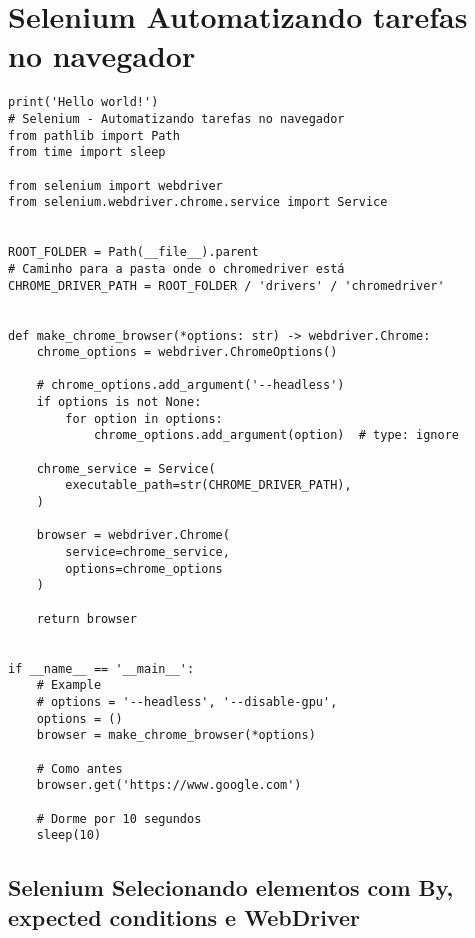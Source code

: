 \documentclass{article}
\begin{document}
\section{Selenium  Automatizando tarefas no navegador}
\begin{lstlisting}
print('Hello world!')
# Selenium - Automatizando tarefas no navegador
from pathlib import Path
from time import sleep

from selenium import webdriver
from selenium.webdriver.chrome.service import Service


ROOT_FOLDER = Path(__file__).parent
# Caminho para a pasta onde o chromedriver está
CHROME_DRIVER_PATH = ROOT_FOLDER / 'drivers' / 'chromedriver'


def make_chrome_browser(*options: str) -> webdriver.Chrome:
    chrome_options = webdriver.ChromeOptions()

    # chrome_options.add_argument('--headless')
    if options is not None:
        for option in options:
            chrome_options.add_argument(option)  # type: ignore

    chrome_service = Service(
        executable_path=str(CHROME_DRIVER_PATH),
    )

    browser = webdriver.Chrome(
        service=chrome_service,
        options=chrome_options
    )

    return browser


if __name__ == '__main__':
    # Example
    # options = '--headless', '--disable-gpu',
    options = ()
    browser = make_chrome_browser(*options)

    # Como antes
    browser.get('https://www.google.com')

    # Dorme por 10 segundos
    sleep(10)
\end{lstlisting}

\subsection{Selenium  Selecionando elementos com By, expected conditions e WebDriver}
\end{document}
